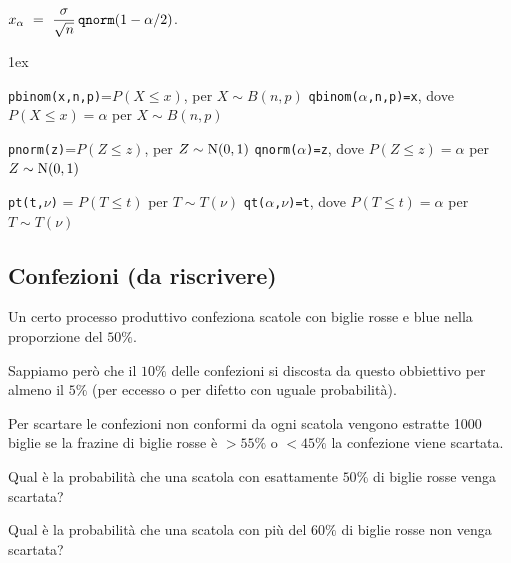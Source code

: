\documentclass[11pt,openany]{book}
\begin{document}
\hfill $x_\alpha\ =\ \dfrac{\sigma}{\sqrt n}\,{\tt qnorm}(1-\alpha/2)$.


\vfill
\parskip1ex
{\hrulefill\scriptsize

{\tt pbinom(x,n,p)}=$P(X\le x)$, per $X\sim B(n,p)$
\hfill 
{\tt qbinom($\alpha$,n,p)=x},  dove $P(X\le x)=\alpha$ per $X\sim B(n,p)$

{\tt pnorm(z)}=$P(Z\le z)$, per $Z\sim {\rm N}(0,1)$
\hfill 
{\tt qnorm($\alpha$)=z},  dove $P(Z\le z)=\alpha$ per $Z\sim {\rm N}(0,1)$

{\tt pt(t,$\nu$)} = $P(T\le t)$ per $T\sim T(\nu)$
\hfill
{\tt qt($\alpha$,$\nu$)=t}, dove $P(T\le t)=\alpha$ per $T\sim T(\nu)$

}


\clearpage\subsection{Confezioni (da riscrivere)}

Un certo processo produttivo confeziona scatole con biglie rosse e blue nella proporzione del $50\%$.

Sappiamo però che il $10\%$ delle confezioni si discosta da questo obbiettivo per almeno il $5\%$ (per eccesso o per difetto con uguale probabilità).

Per scartare le confezioni non conformi da ogni scatola vengono estratte 1000 biglie se la frazine di biglie rosse è $>55\%$ o $<45\%$ la confezione viene scartata.

Qual è la probabilità che una scatola con esattamente $50\%$ di biglie rosse venga scartata?

Qual è la probabilità che una scatola con più del $60\%$ di biglie rosse non venga scartata?
\end{document}
